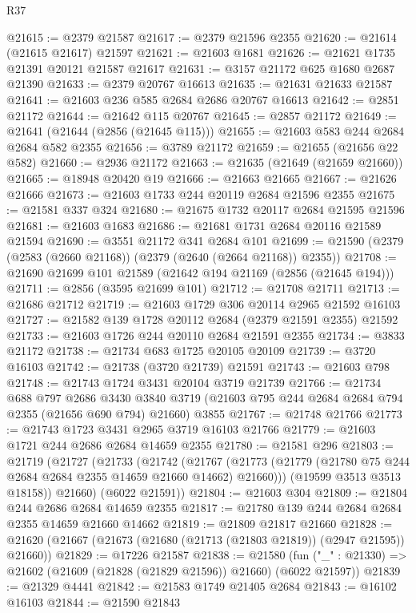 \begin{lexlean}{R37}
\begin{coremodule}
@21615 := @2379 @21587
@21617 := @2379 @21596 @2355
@21620 := @21614 (@21615 @21617) @21597
@21621 := @21603 @1681
@21626 := @21621 @1735 @21391 @20121 @21587 @21617
@21631 := @3157 @21172 @625 @1680 @2687 @21390
@21633 := @2379 @20767 @16613
@21635 := @21631 @21633 @21587
@21641 := @21603 @236 @585 @2684 @2686 @20767 @16613
@21642 := @2851 @21172
@21644 := @21642 @115 @20767
@21645 := @2857 @21172
@21649 := @21641 (@21644 (@2856 (@21645 @115)))
@21655 := @21603 @583 @244 @2684 @2684 @582 @2355
@21656 := @3789 @21172
@21659 := @21655 (@21656 @22 @582)
@21660 := @2936 @21172
@21663 := @21635 (@21649 (@21659 @21660))
@21665 := @18948 @20420 @19
@21666 := @21663 @21665
@21667 := @21626 @21666
@21673 := @21603 @1733 @244 @20119 @2684 @21596 @2355
@21675 := @21581 @337 @324
@21680 := @21675 @1732 @20117 @2684 @21595 @21596
@21681 := @21603 @1683
@21686 := @21681 @1731 @2684 @20116 @21589 @21594
@21690 := @3551 @21172 @341 @2684 @101
@21699 := @21590 (@2379 (@2583 (@2660 @21168)) (@2379 (@2640 (@2664 @21168)) @2355))
@21708 := @21690 @21699 @101 @21589 (@21642 @194 @21169 (@2856 (@21645 @194)))
@21711 := @2856 (@3595 @21699 @101)
@21712 := @21708 @21711
@21713 := @21686 @21712
@21719 := @21603 @1729 @306 @20114 @2965 @21592 @16103
@21727 := @21582 @139 @1728 @20112 @2684 (@2379 @21591 @2355) @21592
@21733 := @21603 @1726 @244 @20110 @2684 @21591 @2355
@21734 := @3833 @21172
@21738 := @21734 @683 @1725 @20105 @20109
@21739 := @3720 @16103
@21742 := @21738 (@3720 @21739) @21591
@21743 := @21603 @798
@21748 := @21743 @1724 @3431 @20104 @3719 @21739
@21766 := @21734
    @688
    @797
    @2686
    @3430
    @3840
    @3719
    (@21603 @795 @244 @2684 @2684 @794 @2355 (@21656 @690 @794) @21660)
    @3855
@21767 := @21748 @21766
@21773 := @21743 @1723 @3431 @2965 @3719 @16103 @21766
@21779 := @21603 @1721 @244 @2686 @2684 @14659 @2355
@21780 := @21581 @296
@21803 := @21719
    (@21727
      (@21733
        (@21742
          (@21767 (@21773 (@21779 (@21780 @75 @244 @2684 @2684 @2355 @14659 @21660 @14662) @21660)))
          (@19599 @3513 @3513 @18158))
        @21660)
      (@6022 @21591))
@21804 := @21603 @304
@21809 := @21804 @244 @2686 @2684 @14659 @2355
@21817 := @21780 @139 @244 @2684 @2684 @2355 @14659 @21660 @14662
@21819 := @21809 @21817 @21660
@21828 := @21620 (@21667 (@21673 (@21680 (@21713 (@21803 @21819)) (@2947 @21595)) @21660))
@21829 := @17226 @21587
@21838 := @21580
    (fun ("_" : @21330) => @21602 (@21609 (@21828 (@21829 @21596)) @21660) (@6022 @21597))
@21839 := @21329 @4441
@21842 := @21583 @1749 @21405 @2684
@21843 := @16102 @16103
@21844 := @21590 @21843

\end{coremodule}
\end{lexlean}
